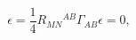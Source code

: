 \begin{equation}
[{D}_{M}, {D}_{N}] \epsilon=\frac{1}{4}R_{MN}{}^{AB}\Gamma_{AB}\epsilon=0,
\label{integrability}
\end{equation}

